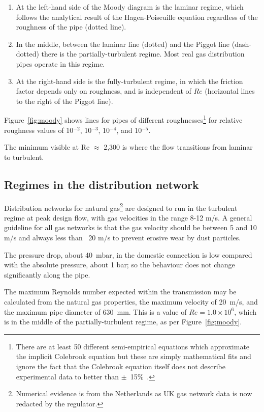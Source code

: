 \documentclass[5p]{elsarticle} %
\begin{document}
\begin{enumerate}
    \item At the left-hand side of the Moody diagram is the laminar regime, which follows the analytical result of the Hagen-Poiseuille equation regardless of the roughness of the pipe (dotted line). 
    \item In the middle, between the laminar line (dotted) and the Piggot line (dash-dotted) there is the partially-turbulent regime. Most real gas distribution pipes operate in this regime.
    \item At the right-hand side is the fully-turbulent regime, in which the friction factor depends only on roughness, and is independent of $Re$ (horizontal lines to the right of the Piggot line).
\end{enumerate}

Figure~\ref{fig:moody} shows lines for pipes of different 
roughnesses\footnote{There are at least 50 different semi-empirical equations which approximate the implicit Colebrook equation but these are simply mathematical fits and ignore the fact that  the Colebrook equation itself does not describe experimental data to better than $\pm$~15\%~\cite{Allen2007, Cerbus2018, She2012}.  
} 
 for relative roughness values of 10$^{-2}$, 10$^{-3}$, 10$^{-4}$, and 10$^{-5}$. 

The minimum visible at Re $\approx$ 2,300 is where the flow transitions from laminar to turbulent\citep{Allen2007}. 

\subsection{Regimes in the distribution network }
\label{sec:service}

Distribution networks for natural gas\footnote{Numerical evidence is from the Netherlands\citep{Schouten2004} as UK gas network data is now redacted by the regulator.
} are designed to run in the turbulent regime at peak design flow, with gas velocities in the range 8-12 m/s. 
A general guideline for all gas networks is that the gas velocity should be between 5 and 10 m/s and always less than ~20 m/s to prevent erosive wear by dust particles\citep{Schouten2004,Tabkhi2008,Ejo2020, Abbas2021}.

The pressure drop, about 40~mbar, in the domestic connection is low compared with the absolute pressure, about 1 bar; so the behaviour does not change significantly along the pipe.

The maximum Reynolds number expected within the transmission may be calculated from the natural gas properties, the maximum velocity of 20~m/s, and the maximum pipe diameter of 630~mm\citep{GPS2008}.
This is a value of $Re = 1.0\times10^6$, which is in the middle of the partially-turbulent regime, as per Figure~\ref{fig:moody}.
\end{document}

